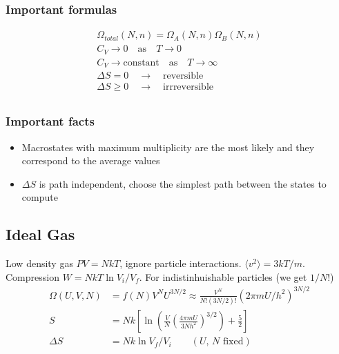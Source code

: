 \documentclass[a4paper, norsk, 8pt]{article}
\begin{document}
\begin{multicols*}{3}
\subsubsection*{\scriptsize Important formulas}
\begin{align*}
  \Omega_{total}(N, n) = \Omega_A(N, n)\Omega_B(N, n)\\
  C_V \rightarrow 0 \quad \text{as} \quad T \rightarrow 0 \\
  C_V \rightarrow \text{constant} \quad \text{as} \quad T \rightarrow \infty \\
  \Delta S = 0 \quad \rightarrow \quad \text{reversible} \\
  \Delta S \geq 0 \quad \rightarrow \quad \text{irrreversible} \\
\end{align*}

\subsubsection*{\scriptsize Important facts}
\begin{itemize}
  \item Macrostates with maximum multiplicity are the most likely and they correspond to the average values
  \item $\Delta S$ is path independent, choose the simplest path between the states to compute
\end{itemize}

\subsection*{\footnotesize  Ideal Gas}
Low density gas $PV=NkT$, ignore particle interactions. $\langle v^2 \rangle = 3kT/m$. Compression $W =NkT\ln{V_i/V_f}$.
For indistinhuishable particles (we get $1/N!$)
\begin{align*}
  \Omega(U, V, N) &= f(N)V^NU^{3N/2} \approx \frac{V^N}{N!(3N/2)!}(2\pi mU/h^2)^{3N/2} \\
  S &= Nk\left[\ln\left( \frac{V}{N}\left( \frac{4\pi m U}{3Nh^2} \right)^{3/2}  \right) + \frac{5}{2}\right] \\
  \Delta S &= Nk\ln{V_f/V_i} \qquad (\text{$U$, $N$ fixed})
\end{align*}



\end{multicols*}
\end{document}
